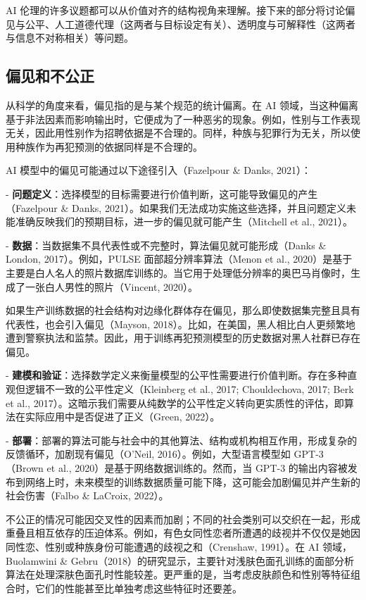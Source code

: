 \documentclass[lang=cn,newtx,10pt,scheme=chinese]{elegantbook}
\begin{document}
AI 伦理的许多议题都可以从价值对齐的结构视角来理解。接下来的部分将讨论偏见与公平、人工道德代理（这两者与目标设定有关）、透明度与可解释性（这两者与信息不对称相关）等问题。

\subsection{偏见和不公正}
从科学的角度来看，偏见指的是与某个规范的统计偏离。在 AI 领域，当这种偏离基于非法因素而影响输出时，它便成为了一种恶劣的现象。例如，性别与工作表现无关，因此用性别作为招聘依据是不合理的。同样，种族与犯罪行为无关，所以使用种族作为再犯预测的依据同样是不合理的。

AI 模型中的偏见可能通过以下途径引入（Fazelpour \& Danks, 2021）：

- \textbf{问题定义}：选择模型的目标需要进行价值判断，这可能导致偏见的产生（Fazelpour \& Danks, 2021）。如果我们无法成功实施这些选择，并且问题定义未能准确反映我们的预期目标，进一步的偏见就可能产生（Mitchell et al., 2021）。

- \textbf{数据}：当数据集不具代表性或不完整时，算法偏见就可能形成（Danks \& London, 2017）。例如，PULSE 面部超分辨率算法（Menon et al., 2020）是基于主要是白人名人的照片数据库训练的。当它用于处理低分辨率的奥巴马肖像时，生成了一张白人男性的照片（Vincent, 2020）。

如果生产训练数据的社会结构对边缘化群体存在偏见，那么即使数据集完整且具有代表性，也会引入偏见（Mayson, 2018）。比如，在美国，黑人相比白人更频繁地遭到警察执法和监禁。因此，用于训练再犯预测模型的历史数据对黑人社群已存在偏见。

- \textbf{建模和验证}：选择数学定义来衡量模型的公平性需要进行价值判断。存在多种直观但逻辑不一致的公平性定义（Kleinberg et al., 2017; Chouldechova, 2017; Berk et al., 2017）。这暗示我们需要从纯数学的公平性定义转向更实质性的评估，即算法在实际应用中是否促进了正义（Green, 2022）。

- \textbf{部署}：部署的算法可能与社会中的其他算法、结构或机构相互作用，形成复杂的反馈循环，加剧现有偏见（O’Neil, 2016）。例如，大型语言模型如 GPT-3（Brown et al., 2020）是基于网络数据训练的。然而，当 GPT-3 的输出内容被发布到网络上时，未来模型的训练数据质量可能下降，这可能会加剧偏见并产生新的社会伤害（Falbo \& LaCroix, 2022）。

不公正的情况可能因交叉性的因素而加剧；不同的社会类别可以交织在一起，形成重叠且相互依存的压迫体系。例如，有色女同性恋者所遭遇的歧视并不仅仅是她因同性恋、性别或种族身份可能遭遇的歧视之和（Crenshaw, 1991）。在 AI 领域，Buolamwini \& Gebru（2018）的研究显示，主要针对浅肤色面孔训练的面部分析算法在处理深肤色面孔时性能较差。更严重的是，当考虑皮肤颜色和性别等特征组合时，它们的性能甚至比单独考虑这些特征时还要差。
\end{document}
